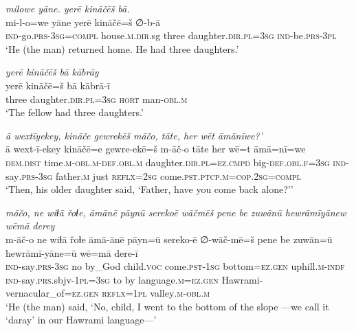 \ea \label{ŽH.20}
\textit{milowe yāne. yerē kināčēš bā.} \\ 
\gll mi-l-o=we yāne yerē kināčē=š ∅-b-ā \\ 
 \textsc{ind-}go\textsc{.prs}\textsc{-3sg}\textsc{=compl} house\textsc{.m}\textsc{.dir}.sg three daughter\textsc{.dir}\textsc{.pl}\textsc{=3sg} \textsc{ind-}be\textsc{.prs}\textsc{-3pl} \\ 
\glt `He (the man) returned home. He had three daughters.'
\z 
 
\ea \label{ŽH.21}
\textit{yerē kināčēš bā kābrāy} \\ 
\gll yerē kināčē=š bā kābrā-ī \\ 
 three daughter\textsc{.dir}\textsc{.pl}\textsc{=3sg} \textsc{hort} man\textsc{-obl}\textsc{.m} \\ 
\glt `The fellow had three daughters.'
\z 
 
\ea \label{ŽH.22}
\textit{ā wextīyekey, kināče gewrekēš māčo, tāte, her wēt āmānīwe?’} \\ 
\gll ā wext-ī-ekey kināčē=e gewre-ekē=š m-āč-o tāte her wē=t āmā=nī=we \\ 
 \textsc{dem.dist} time\textsc{.m}\textsc{-obl}\textsc{.m}\textsc{-def}\textsc{.obl}\textsc{.m} daughter\textsc{.dir}\textsc{.pl}\textsc{=ez}\textsc{.cmpd} big\textsc{-def}\textsc{.obl}\textsc{\textsc{.f}}\textsc{=3sg} \textsc{ind-}say\textsc{.prs}\textsc{-3sg} father\textsc{.m} just \textsc{reflx}\textsc{=\textsc{2sg}} come\textsc{.pst}\textsc{.ptcp}\textsc{.m}\textsc{=cop}\textsc{.\textsc{2sg}}\textsc{=compl} \\ 
\glt `Then, his older daughter said, ‘Father, have you come back alone?’'
\z 
 
\ea \label{ŽH.23}
\textit{māčo, ne wiɫā řoɫe, āmānē pāynū serekoē wāčmēš pene be zuwānū hewrāmīyānew wēmā derey} \\ 
\gll m-āč-o ne wiɫā řoɫe āmā-ānē pāyn=ū sereko-ē ∅-wāč-mē=š pene be zuwān=ū hewrāmī-yāne=ū wē=mā dere-ī \\ 
 \textsc{ind-}say\textsc{.prs}\textsc{-3sg} no by\_God child.\textsc{voc} come\textsc{.pst}\textsc{-1sg} bottom\textsc{=ez}\textsc{.gen} uphill\textsc{.m}\textsc{-indf} \textsc{ind-}say\textsc{.prs}.sbjv\textsc{-1pl}\textsc{=3sg} to by language\textsc{.m}\textsc{=ez}\textsc{.gen} Hawrami-vernacular\_of\textsc{=ez}\textsc{.gen} \textsc{reflx}\textsc{=1pl} valley\textsc{.m}\textsc{-obl}\textsc{.m} \\ 
\glt `He (the man) said, ‘No, child, I went to the bottom of the slope —we call it ‘daray’ in our Hawrami language—'
\z 
 
